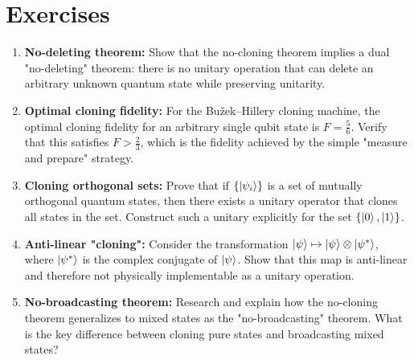 \documentclass[12pt]{article}
\newcommand{\tensor}{\otimes}
\begin{document}
\section*{Exercises}

\begin{enumerate}
    \item \textbf{No-deleting theorem:} Show that the no-cloning theorem implies a dual "no-deleting" theorem: there is no unitary operation that can delete an arbitrary unknown quantum state while preserving unitarity.
    
    \item \textbf{Optimal cloning fidelity:} For the Bužek–Hillery cloning machine, the optimal cloning fidelity for an arbitrary single qubit state is $F = \frac{5}{6}$. Verify that this satisfies $F > \frac{2}{3}$, which is the fidelity achieved by the simple "measure and prepare" strategy.
    
    \item \textbf{Cloning orthogonal sets:} Prove that if $\{\ket{\psi_i}\}$ is a set of mutually orthogonal quantum states, then there exists a unitary operator that clones all states in the set. Construct such a unitary explicitly for the set $\{\ket{0}, \ket{1}\}$.
    
    \item \textbf{Anti-linear "cloning":} Consider the transformation $\ket{\psi} \mapsto \ket{\psi} \tensor \ket{\psi^*}$, where $\ket{\psi^*}$ is the complex conjugate of $\ket{\psi}$. Show that this map is anti-linear and therefore not physically implementable as a unitary operation.
    
    \item \textbf{No-broadcasting theorem:} Research and explain how the no-cloning theorem generalizes to mixed states as the "no-broadcasting" theorem. What is the key difference between cloning pure states and broadcasting mixed states?
\end{enumerate}
\end{document}
